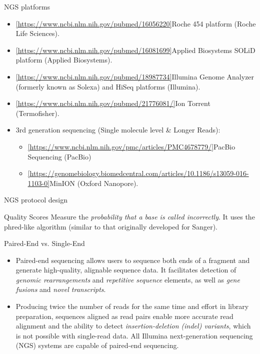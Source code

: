 \documentclass{if-beamer}
\begin{document}
\begin{frame}{NGS platforms}
\begin{large}
\begin{itemize}
    \item \cref{https://www.ncbi.nlm.nih.gov/pubmed/16056220}{Roche 454 platform} (Roche Life Sciences).
    \item \cref{https://www.ncbi.nlm.nih.gov/pubmed/16081699}{Applied Biosystems SOLiD platform} (Applied Biosystems).
    \item \cref{https://www.ncbi.nlm.nih.gov/pubmed/18987734}{Illumina Genome Analyzer} (formerly known as Solexa) and HiSeq platforms (Illumina). 
    \item \cref{https://www.ncbi.nlm.nih.gov/pubmed/21776081/}{Ion Torrent} (Termofisher).
    \item 3rd generation sequencing (Single molecule level \& Longer Reads): 
    \begin{itemize}
        \item \cref{https://www.ncbi.nlm.nih.gov/pmc/articles/PMC4678779/}{PacBio Sequencing} (PacBio)
        \item \cref{https://genomebiology.biomedcentral.com/articles/10.1186/s13059-016-1103-0}{MinION} (Oxford Nanopore).
    \end{itemize}
\end{itemize}
\end{large}
\end{frame}
\begin{frame}{NGS protocol design}
\begin{exampleblock}{Quality Scores}
Measure the \emph{probability that a base is called incorrectly}. It uses the phred-like algorithm (similar to that originally developed for Sanger).
\end{exampleblock}
\begin{exampleblock}{Paired-End vs. Single-End}
\begin{itemize}
  \item Paired-end sequencing allows users to sequence both ends of a fragment and generate high-quality, alignable sequence data. It facilitates detection of \emph{genomic rearrangements} and \emph{repetitive sequence} elements, as well as \emph{gene fusions} and \emph{novel transcripts}.
  \item Producing twice the number of reads for the same time and effort in library preparation, sequences aligned as read pairs enable more accurate read alignment and the ability to detect \emph{insertion-deletion (indel) variants}, which is not possible with single-read data. All Illumina next-generation sequencing (NGS) systems are capable of paired-end sequencing.
\end{itemize}
\end{exampleblock}
\end{frame}
\end{document}
